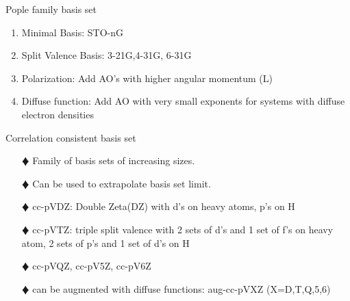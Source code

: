\documentclass[slidestop,mathserif,compress,xcolor=svgnames]{beamer}
\begin{document}
\begin{frame}
  \begin{block}{Pople family basis set}
    \begin{enumerate}
      \item Minimal Basis: STO-nG
      \item Split Valence Basis: 3-21G,4-31G, 6-31G
      \item Polarization: Add AO's with higher angular momentum (L)
      \item Diffuse function: Add AO with very small exponents for systems with diffuse electron densities
    \end{enumerate}
  \end{block}
\end{frame}

\begin{frame}
  \begin{block}{Correlation consistent basis set}
    \begin{enumerate}
      \item[$\vardiamond$]Family of basis sets of increasing sizes.
      \item[$\vardiamond$]Can be used to extrapolate basis set limit.
      \item[$\vardiamond$]cc-pVDZ: Double Zeta(DZ) with d's on heavy atoms, p's on H
      \item[$\vardiamond$]cc-pVTZ: triple split valence with 2 sets of d's and 1 set of f's on heavy atom, 2 sets of p's and 1 set of d's on H
      \item[$\vardiamond$]cc-pVQZ, cc-pV5Z, cc-pV6Z
      \item[$\vardiamond$]can be augmented with diffuse functions: aug-cc-pVXZ (X=D,T,Q,5,6)
    \end{enumerate}
  \end{block}
\end{frame}
\end{document}
